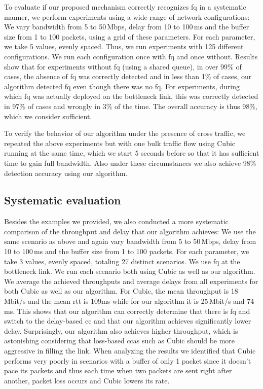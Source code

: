 \documentclass[runningheads]{llncs}
\begin{document}
To evaluate if our proposed mechanism correctly recognizes \gls{fq} in a systematic manner, we perform experiments using a wide range of network configurations: We vary bandwidth from 5 to 50\,Mbps, delay from 10 to 100\,ms and the buffer size from 1 to 100 packets, using a grid of these parameters. For each parameter, we take 5 values, evenly spaced. Thus, we run experiments with 125 different configurations. We run each configuration once with \gls{fq} and once without. Results show that for experiments without \gls{fq} (using a shared queue), in over 99\% of cases, the absence of \gls{fq} was correctly detected and in less than 1\% of cases, our algorithm detected \gls{fq} even though there was no \gls{fq}. For experiments, during which \gls{fq} was actually deployed on the bottleneck link, this was correctly detected in 97\% of cases and wrongly in 3\% of the time. The overall accuracy is thus 98\%, which we consider sufficient. 

To verify the behavior of our algorithm under the presence of cross traffic, we repeated the above experiments but with one bulk traffic flow using Cubic running at the same time, which we start 5 seconds before so that it has sufficient time to gain full bandwidth. Also under these circumstances we also achieve 98\% detection accuracy using our algorithm. 

\subsection{Systematic evaluation}

Besides the examples we provided, we also conducted a more systematic comparison of the throughput and delay that our algorithm achieves: We use the same scenario as above and again vary bandwidth from 5 to 50\,Mbps, delay from 10 to 100\,ms and the buffer size from 1 to 100 packets. For each parameter, we take 3 values, evenly spaced, totaling 27 distinct scenarios. We use \gls{fq} at the bottleneck link. We run each scenario both using Cubic as well as our algorithm. We average the achieved throughputs and average delays from all experiments for both Cubic as well as our algorithm. For Cubic, the mean throughput is 18\,Mbit/s and the mean \gls{rtt} is 109\;ms while for our algorithm it is 25\,Mbit/s and 74\,ms. This shows that our algorithm can correctly determine that there is \gls{fq} and switch to the delay-based \gls{cc} and that our algorithm achieves significantly lower delay. Surprisingly, our algorithm also achieves higher throughput, which is astonishing considering that loss-based \glspl{cca} such as Cubic should be more aggressive in filling the link. When analyzing the results we identified that Cubic performs very poorly in scenarios with a buffer of only 1 packet since it doesn't pace its packets and thus each time when two packets are sent right after another, packet loss occurs and Cubic lowers its rate. 
\end{document}
